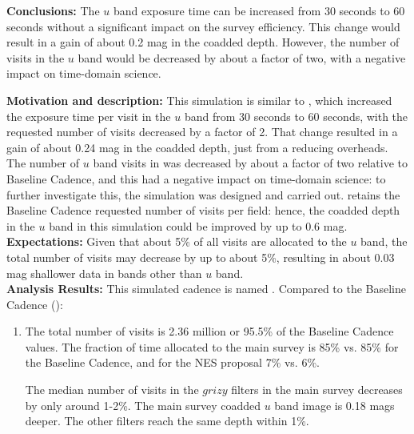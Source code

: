 {\bf Conclusions:} The $u$ band exposure time can be increased from 30
seconds to 60 seconds without a significant impact on the survey
efficiency. This change would result in a gain of about 0.2 mag in the
coadded depth. However, the number of visits in the $u$ band would be
decreased by about a factor of two, with a negative impact on
time-domain science.



{\bf Motivation and description:} This simulation is similar to
, which increased the exposure time
per visit in the $u$ band from 30 seconds to 60 seconds, with the
requested number of visits decreased by a factor of 2. That change
resulted in a gain of about 0.24 mag in the coadded depth, just from a reducing overheads. The
number of $u$ band visits in  was
decreased by about a factor of two relative to Baseline Cadence, and this had a negative impact on
time-domain science: to further investigate this, the  simulation was designed and carried out.  retains the Baseline Cadence
requested number of visits per field: hence, the coadded depth in the
$u$ band in this simulation could be improved by up to 0.6 mag. \\

{\bf Expectations:}  Given that about 5\% of all visits are allocated
to the $u$ band, the total number of visits may decrease by up to
about 5\%, resulting in about 0.03 mag shallower data in bands other
than $u$ band. \\

{\bf Analysis Results:}  This simulated cadence is named
.  Compared to the Baseline
Cadence ():
\begin{enumerate}
\item The total number of visits is 2.36 million or 95.5\% of the
Baseline Cadence values. The fraction of time allocated to the main
survey is 85\% vs. 85\% for the Baseline Cadence, and for the NES
proposal 7\% vs. 6\%.

The median number of visits in the $grizy$ filters in the main survey
decreases by only around 1-2\%.  The main survey coadded $u$ band image is 0.18
mags deeper. The other filters reach the same depth within 1\%.
\end{enumerate}


